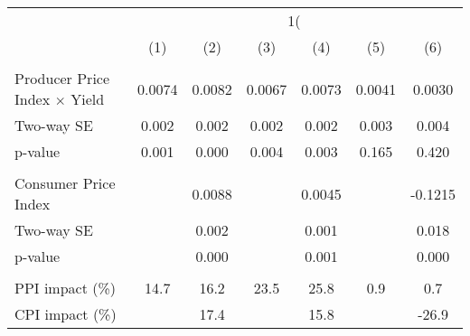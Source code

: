 {
\def\sym#1{\ifmmode^{#1}\else\(^{#1}\)\fi}
\begin{tabular}{l*{6}{c}}
\hline\hline
                    &&&\\\cmidrule(lr){2-3}\cmidrule(lr){4-5}\cmidrule(lr){6-7}
                    &         &         &         &         &         &         \\
\hline
\hline
\\ Producer Price Index $\times$ Yield&      0.0074         &      0.0082         &      0.0067         &      0.0073         &      0.0041         &      0.0030         \\
\hspace{15pt} Two-way SE&       0.002         &       0.002         &       0.002         &       0.002         &       0.003         &       0.004         \\
\hspace{25pt} p-value&       0.001         &       0.000         &       0.004         &       0.003         &       0.165         &       0.420         \\
\\ Consumer Price Index&                     &      0.0088         &                     &      0.0045         &                     &     -0.1215         \\
\hspace{15pt} Two-way SE&                     &       0.002         &                     &       0.001         &                     &       0.018         \\
\hspace{25pt} p-value&                     &       0.000         &                     &       0.001         &                     &       0.000         \\
\hline \\ PPI impact (\%)&        14.7         &        16.2         &        23.5         &        25.8         &         0.9         &         0.7         \\
CPI impact (\%)     &                     &        17.4         &                     &        15.8         &                     &       -26.9         \\

\end{tabular}}
